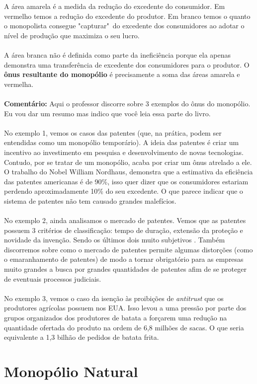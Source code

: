\documentclass[a4paper,11pt,oneside]{book}
\theoremstyle{definition}
\theoremstyle{break}
\begin{document}
A área amarela é a medida da redução do excedente do consumidor. Em vermelho temos a redução do excedente do produtor. Em branco temos o quanto o monopolista consegue "capturar"\ do excedente dos consumidores ao adotar o nível de produção que maximiza o seu lucro.
\\~\\
A área branca não é definida como parte da ineficiência porque ela apenas demonstra uma transferência de excedente dos consumidores para o produtor. O \textbf{ônus resultante do monopólio} é precisamente a soma das áreas amarela e vermelha.
\\~\\
\textbf{Comentário:} Aqui o professor discorre sobre 3 exemplos do ônus do monopólio. Eu vou dar um resumo mas indico que você leia essa parte do livro.
\\~\\
No exemplo 1, vemos os casos das patentes (que, na prática, podem ser entendidas como um monopólio temporário). A ideia das patentes é criar um incentivo ao investimento em pesquisa e desenvolvimento de novas tecnologias. Contudo, por se tratar de um monopólio, acaba por criar um ônus atrelado a ele. O trabalho do Nobel William Nordhaus, demonstra que a estimativa da eficiência das patentes americanas é de 90\%, isso quer dizer que os consumidores estariam perdendo aproximadamente 10\% do seu excedente. O que parece indicar que o sistema de patentes não tem causado grandes malefícios.
\\~\\
No exemplo 2, ainda analisamos o mercado de patentes. Vemos que as patentes possuem 3 critérios de classificação: tempo de duração, extensão da proteção e novidade da invenção. Sendo os últimos dois muito subjetivos . Também discorremos sobre como o mercado de patentes permite algumas distorções (como o emaranhamento de patentes) de modo a tornar obrigatório para as empresas muito grandes a busca por grandes quantidades de patentes afim de se proteger de eventuais processos judiciais.
\\~\\
No exemplo 3, vemos o caso da isenção às proibições de \textit{antitrust} que os produtores agrícolas possuem nos EUA. Isso levou a uma pressão por parte dos grupos organizados dos produtores de batata a forçarem uma redução na quantidade ofertada do produto na ordem de 6,8 milhões de sacas. O que seria equivalente a 1,3 bilhão de pedidos de batata frita.

\section{Monopólio Natural}
\end{document}
